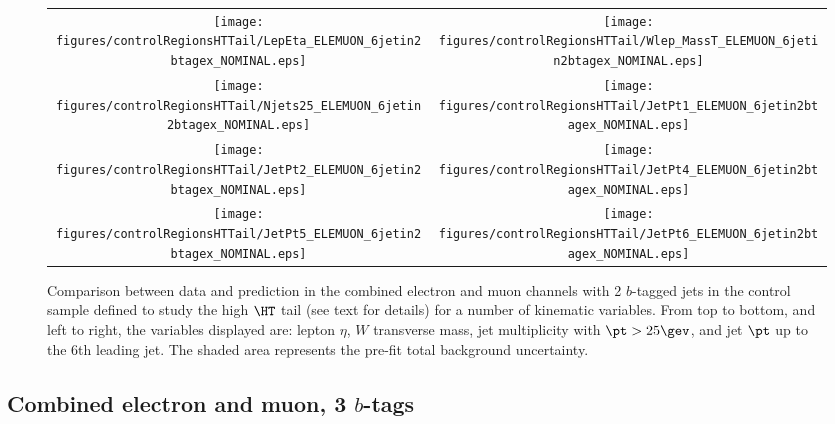\begin{figure}[htbp]
\begin{center}
\begin{tabular}{cc}
%
\texttt{[image: figures/controlRegionsHTTail/LepEta\_ELEMUON\_6jetin2btagex\_NOMINAL.eps]} &
\texttt{[image: figures/controlRegionsHTTail/Wlep\_MassT\_ELEMUON\_6jetin2btagex\_NOMINAL.eps]} \\
\texttt{[image: figures/controlRegionsHTTail/Njets25\_ELEMUON\_6jetin2btagex\_NOMINAL.eps]} &
\texttt{[image: figures/controlRegionsHTTail/JetPt1\_ELEMUON\_6jetin2btagex\_NOMINAL.eps]} \\
\texttt{[image: figures/controlRegionsHTTail/JetPt2\_ELEMUON\_6jetin2btagex\_NOMINAL.eps]} &
\texttt{[image: figures/controlRegionsHTTail/JetPt4\_ELEMUON\_6jetin2btagex\_NOMINAL.eps]} \\
\texttt{[image: figures/controlRegionsHTTail/JetPt5\_ELEMUON\_6jetin2btagex\_NOMINAL.eps]} &
\texttt{[image: figures/controlRegionsHTTail/JetPt6\_ELEMUON\_6jetin2btagex\_NOMINAL.eps]} \\
\end{tabular}\caption{\small {Comparison between data and prediction in the combined electron and muon channels with 2 $b$-tagged jets in the control sample
defined to study the high $\HT$ tail (see text for details)  for a number of kinematic
variables. From top to bottom, and left to right, the variables displayed are: lepton $\eta$, $W$ transverse mass, jet multiplicity with $\pt>25\gev$, 
and jet $\pt$ up to the 6th leading jet.
The shaded area represents the pre-fit total background uncertainty.}}
\label{fig:ELEMUON_controlHTTail_2btagex_2}
\end{center}
\end{figure}

\clearpage
\subsection{Combined electron and muon, 3 $b$-tags}
\label{sec:ELEMUON_controlHTTail_3tagex}

